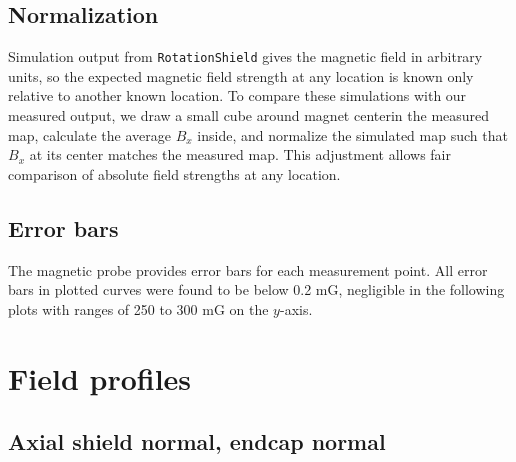 \documentclass[twocolumn,aps,prb,citeautoscript]{revtex4-1}
\begin{document}
%
%
%

\subsection{Normalization}

Simulation output from \texttt{RotationShield} gives the magnetic field in arbitrary units, so the expected
magnetic field strength at any location is known only relative to another known location. To compare these simulations
with our measured output, we draw a small cube around magnet centerin the measured map,
calculate the average $B_x$ inside, and normalize the simulated map such that $B_x$ at its center matches the
measured map. This adjustment allows fair comparison of absolute field strengths at any location.

\subsection{Error bars}

The magnetic probe provides error bars for each measurement point. All error bars in plotted curves were found
to be below 0.2 mG, negligible in the following plots with ranges of 250 to 300 mG on the $y$-axis.

\section{Field profiles}

\subsection{Axial shield normal, endcap normal}
\end{document}
